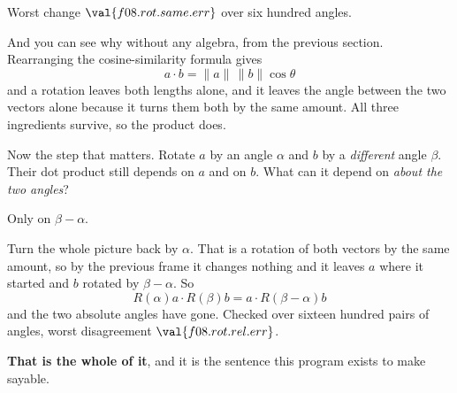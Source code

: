 \begin{fr}
Worst change $\val{f08.rot.same.err}$ over six hundred angles.

And you can see why without any algebra, from the previous section.
Rearranging the cosine-similarity formula gives
\[ a \cdot b = \lVert a \rVert\, \lVert b \rVert \cos\theta \]
and a rotation leaves both lengths
alone, and it leaves the angle between the two vectors alone because it turns
them both by the same amount. All three ingredients survive, so the product
does.

Now the step that matters. Rotate $a$ by an angle $\alpha$ and $b$ by a
\emph{different} angle $\beta$. Their dot product still depends on $a$ and on
$b$. What can it depend on \emph{about the two angles}?
\nextframe
\end{fr}

\begin{fr}
\begin{ansblock}
Only on $\beta - \alpha$.
\end{ansblock}

Turn the whole picture back by $\alpha$. That is a rotation of both vectors by
the same amount, so by the previous frame it changes nothing \dash{} and it
leaves $a$ where it started and $b$ rotated by $\beta - \alpha$. So
\[ R(\alpha)a \cdot R(\beta)b = a \cdot R(\beta - \alpha)b \]
and the two absolute angles have gone. Checked over sixteen hundred pairs of
angles, worst disagreement $\val{f08.rot.rel.err}$.

\textbf{That is the whole of it}, and it is the sentence this program exists to
make sayable.
\end{fr}

